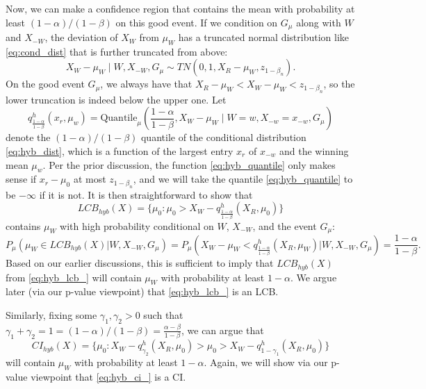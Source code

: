 \documentclass{article}
\begin{document}
\begin{appendix}
Now, we can make a confidence region that contains the mean with probability at least $(1-\alpha)/(1-\beta)$ on this good event. If we condition on $G_{\mu}$ along with $W$ and $X_{-W}$, the deviation of $X_W$ from $\mu_W$ has a truncated normal distribution like \eqref{eq:cond_dist} that is further truncated from above:
\begin{equation}
    \label{eq:hyb_dist}
    X_W - \mu_W \mid W, X_{-W}, G_{\mu} \sim TN(0, 1, X_{R} - \mu_{W}, z_{1-\beta_n} ).
\end{equation}
On the good event $G_{\mu}$, we always have that $X_R - \mu_{W} < X_W - \mu_{W} < z_{1-\beta_n}$, so the lower truncation is indeed below the upper one. Let
\begin{equation}
\label{eq:hyb_quantile}
    q^{h}_{\frac{1-\alpha}{1-\beta}}(x_r, \mu_w) = \text{Quantile}_{\mu}\left(\frac{1-\alpha}{1-\beta}, X_W -  \mu_W \mid W=w, X_{-w} = x_{-w}, G_{\mu}\right)
\end{equation}
denote the $(1-\alpha)/(1-\beta)$ quantile of the conditional distribution \eqref{eq:hyb_dist}, which is a function of the largest entry $x_r$ of $x_{-w}$ and the winning mean $\mu_{w}$. Per the prior discussion, the function \eqref{eq:hyb_quantile} only makes sense if $x_r - \mu_0$ at most $z_{1-\beta_n}$, and we will take the quantile \eqref{eq:hyb_quantile} to be $-\infty$ if it is not. It is then straightforward to show that
\begin{equation}
\label{eq:hyb_lcb_}
     LCB_{hyb}(X) = \{\mu_0 : \mu_0 > X_{W} - q^{h}_{\frac{1-\alpha}{1-\beta}}(X_R, \mu_0)  \} 
\end{equation}
contains $\mu_{W}$ with high probability conditional on $W$, $X_{-W}$, and the event $G_{\mu}$:
\begin{equation*}
    P_{\mu}( \mu_{W} \in LCB_{hyb}(X) | W, X_{-W}, G_{\mu})  = P_{\mu}( X_W - \mu_W < q^{h}_{\frac{1-\alpha}{1-\beta}}(X_R, \mu_W) |W, X_{-W}, G_{\mu}) = \frac{1-\alpha}{1-\beta}.
\end{equation*}
Based on our earlier discussions, this is sufficient to imply that $LCB_{hyb}(X)$ from \eqref{eq:hyb_lcb_} will contain $\mu_{W}$ with probability at least $1-\alpha$. We argue later (via our p-value viewpoint) that \eqref{eq:hyb_lcb_} is an LCB.

Similarly, fixing some $\gamma_1, \gamma_2 > 0$ such that $\gamma_1 + \gamma_2 = 1 = (1-\alpha)/(1-\beta) = \frac{\alpha -\beta}{1-\beta}$, we can argue that 
\begin{equation}
    \label{eq:hyb_ci_}
         CI_{hyb}(X) = \{\mu_0 : X_W - q^{h}_{\gamma_2}(X_R, \mu_0)  > \mu_0 > X_{W} - q^{h}_{1 - \gamma_1}(X_R, \mu_0)  \} 
\end{equation}
will contain $\mu_W$ with probability at least $1-\alpha$. Again, we will show via our p-value viewpoint that \eqref{eq:hyb_ci_} is a CI. 


\end{appendix}
\end{document}
